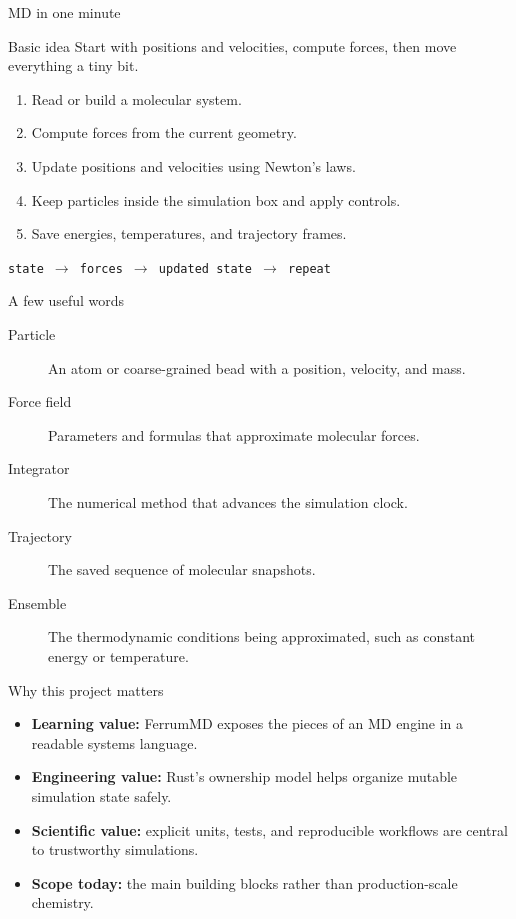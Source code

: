 \documentclass[aspectratio=169]{beamer}
\begin{document}
\begin{frame}{MD in one minute}
\begin{block}{Basic idea}
Start with positions and velocities, compute forces, then move everything a tiny bit.
\end{block}
\begin{enumerate}
  \item Read or build a molecular system.
  \item Compute forces from the current geometry.
  \item Update positions and velocities using Newton's laws.
  \item Keep particles inside the simulation box and apply controls.
  \item Save energies, temperatures, and trajectory frames.
\end{enumerate}
\vspace{0.5em}
\centering
\texttt{state $\rightarrow$ forces $\rightarrow$ updated state $\rightarrow$ repeat}
\end{frame}

\begin{frame}{A few useful words}
\begin{description}
  \item[Particle] An atom or coarse-grained bead with a position, velocity, and mass.
  \item[Force field] Parameters and formulas that approximate molecular forces.
  \item[Integrator] The numerical method that advances the simulation clock.
  \item[Trajectory] The saved sequence of molecular snapshots.
  \item[Ensemble] The thermodynamic conditions being approximated, such as constant energy or temperature.
\end{description}
\end{frame}

\begin{frame}{Why this project matters}
\begin{itemize}
  \item \textbf{Learning value:} FerrumMD exposes the pieces of an MD engine in a readable systems language.
  \item \textbf{Engineering value:} Rust's ownership model helps organize mutable simulation state safely.
  \item \textbf{Scientific value:} explicit units, tests, and reproducible workflows are central to trustworthy simulations.
  \item \textbf{Scope today:} the main building blocks rather than production-scale chemistry.
\end{itemize}
\end{frame}
\end{document}
